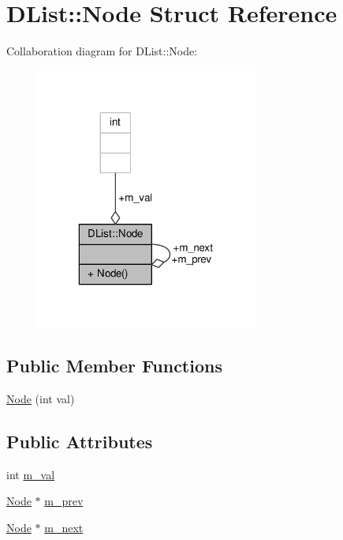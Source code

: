 \hypertarget{structDList_1_1Node}{\section{D\-List\-:\-:Node Struct Reference}
\label{structDList_1_1Node}
}


Collaboration diagram for D\-List\-:\-:Node\-:
\nopagebreak
\begin{figure}[H]
\begin{center}
\leavevmode
\includegraphics[width=208pt]{structDList_1_1Node__coll__graph}
\end{center}
\end{figure}
\subsection*{Public Member Functions}
\begin{DoxyCompactItemize}
\item 
\hyperlink{structDList_1_1Node_abd9051dbbafaece68c9a63fc4d95e71b}{Node} (int val)
\end{DoxyCompactItemize}
\subsection*{Public Attributes}
\begin{DoxyCompactItemize}
\item 
int \hyperlink{structDList_1_1Node_aaca40c46b13bec6b62644dea9c981393}{m\-\_\-val}
\item 
\hyperlink{structDList_1_1Node}{Node} $\ast$ \hyperlink{structDList_1_1Node_a4eee71385364303aa322478aec37cd77}{m\-\_\-prev}
\item 
\hyperlink{structDList_1_1Node}{Node} $\ast$ \hyperlink{structDList_1_1Node_a79bcab027c5269a8790687b6dce4848b}{m\-\_\-next}
\end{DoxyCompactItemize}


